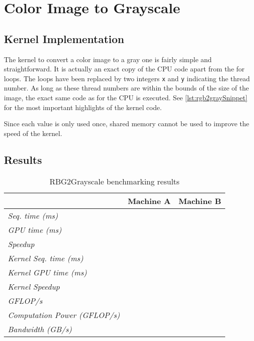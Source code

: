 \documentclass[final]{report}
\begin{document}
\chapter{Color Image to Grayscale}

\section{Kernel Implementation}\label{sec:rgb2gray}
The kernel to convert a color image to a gray one is fairly simple and straightforward.
It is actually an exact copy of the CPU code apart from the for loops.
The loops have been replaced by two integers \texttt{x} and \texttt{y} indicating the thread number.
As long as these thread numbers are within the bounds of the size of the image, the exact same code as for the CPU is executed.
See \cref{lst:rgb2graySnippet} for the most important highlights of the kernel code.


Since each value is only used once, shared memory cannot be used to improve the speed of the kernel.


\section{Results}
\begin{table}[H]
	\centering
	\caption{RBG2Grayscale benchmarking results}
	\label{tab:rgb2grayscale-results}
	\begin{tabular}{lll}
	\toprule
											& \textbf{Machine A} 	& \textbf{Machine B} \\
	\midrule
	\textit{Seq. time (ms)} 				& ~ 					& ~ \\
	\textit{GPU time (ms)} 					& ~ 					& ~ \\
	\textit{Speedup} 						& ~ 					& ~ \\
	\midrule
	\textit{Kernel Seq. time (ms)} 			& ~ 					& ~ \\
	\textit{Kernel GPU time (ms)} 			& ~ 					& ~ \\
	\textit{Kernel Speedup} 				& ~ 					& ~ \\
	\midrule
	\textit{GFLOP/s} 						& ~ 					& ~ \\
	\textit{Computation Power (GFLOP/s)} 	& ~ 					& ~ \\
	\textit{Bandwidth (GB/s)}				& ~ 					& ~ \\
	\bottomrule
	\end{tabular}
\end{table}
\end{document}
